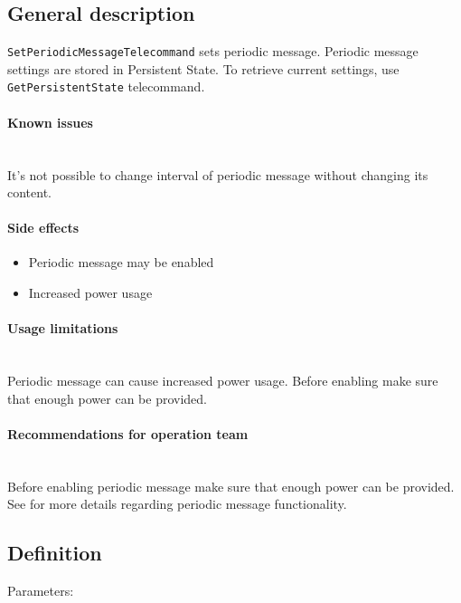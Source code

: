 

\subsection{General description}
\texttt{SetPeriodicMessageTelecommand} sets periodic message. Periodic message settings are stored in Persistent State. To retrieve current settings, use \texttt{GetPersistentState} telecommand. 

\paragraph{Known issues} \mbox{} \\
It's not possible to change interval of periodic message without changing its content.

\paragraph{Side effects}
\begin{itemize}
	\item Periodic message may be enabled
	\item Increased power usage
\end{itemize}

\paragraph{Usage limitations} \mbox{} \\
Periodic message can cause increased power usage. Before enabling make sure that enough power can be provided.

\paragraph{Recommendations for operation team} \mbox{} \\
Before enabling periodic message make sure that enough power can be provided. See  for more details regarding periodic message functionality.

\subsection{Definition}

Parameters:

